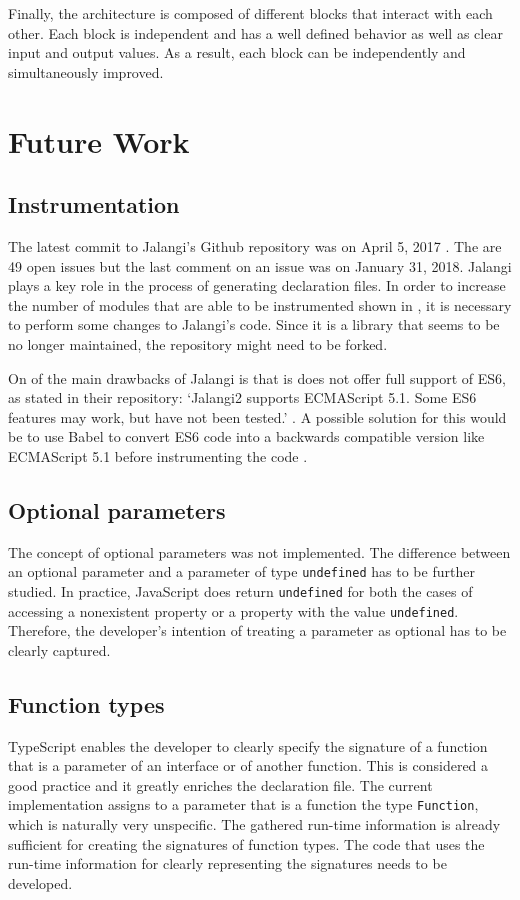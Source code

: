 Finally, the architecture is composed of different blocks that interact with each other. Each block is independent and has a well defined behavior as well as clear input and output values. As a result, each block can be independently and simultaneously improved.

\section{Future Work} \label{sec:conclusions-future-work}
\subsection{Instrumentation}
The latest commit to Jalangi's Github repository was on April 5, 2017 \citep{jalangi-repository}. The are 49 open issues but the last comment on an issue was on January 31, 2018. Jalangi plays a key role in the process of generating declaration files. In order to increase the number of modules that are able to be instrumented shown in , it is necessary to perform some changes to Jalangi's code. Since it is a library that seems to be no longer maintained, the repository might need to be forked.

On of the main drawbacks of Jalangi is that is does not offer full support of ES6, as stated in their repository: `Jalangi2 supports ECMAScript 5.1. Some ES6 features may work, but have not been tested.' \citep{jalangi-repository}. A possible solution for this would be to use Babel to convert ES6 code into a backwards compatible version like ECMAScript 5.1 before instrumenting the code \citep{babel}.

\subsection{Optional parameters}
The concept of optional parameters was not implemented. The difference between an optional parameter and a parameter of type \texttt{undefined} has to be further studied. In practice, JavaScript does return \texttt{undefined} for both the cases of accessing a nonexistent property or a property with the value \texttt{undefined}. Therefore, the developer's intention of treating a parameter as optional has to be clearly captured.

\subsection{Function types}
TypeScript enables the developer to clearly specify the signature of a function that is a parameter of an interface or of another function. This is considered a good practice and it greatly enriches the declaration file. The current implementation assigns to a parameter that is a function the type \texttt{Function}, which is naturally very unspecific. The gathered run-time information is already sufficient for creating the signatures of function types. The code that uses the run-time information for clearly representing the signatures needs to be developed.

